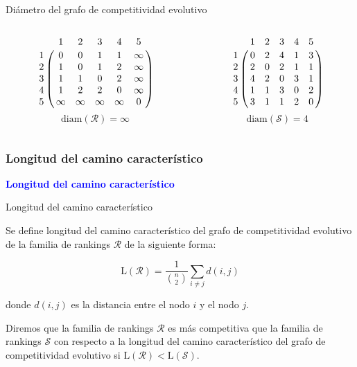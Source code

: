 \documentclass[10pt,hyperref={unicode}]{beamer}
\begin{document}
	\begin{frame}{Diámetro del grafo de competitividad evolutivo}
		\begin{ejemplo}[continuación]
			\begin{columns}[t] %
				\begin{column}{.50\textwidth}
					\begin{equation*}
					\bordermatrix{
						& 1 & 2 & 3 & 4 & 5 \cr
						1 &	0 & 0 & 1 & 1 & \infty \cr
						2 & 1 & 0 & 1 & 2 & \infty \cr
						3 & 1 & 1 & 0 & 2 & \infty \cr
						4 & 1 & 2 & 2 & 0 & \infty \cr
						5 & \infty & \infty & \infty & \infty  &  0  \cr
					}
					\end{equation*}
					\[ \mathrm{diam}(\mathcal{R}) = \infty \]
				\end{column}%
				\hfill%
				\begin{column}{.50\textwidth}
					\begin{equation*}
					\bordermatrix{
						& 1 & 2 & 3 & 4 & 5 \cr
						1 &	0 & 2 & 4 & 1 & 3 \cr
						2 & 2 & 0 & 2 & 1 & 1 \cr
						3 & 4 & 2 & 0 & 3 & 1 \cr
						4 & 1 & 1 & 3 & 0 & 2 \cr
						5 & 3 & 1 & 1 & 2 & 0  \cr
					}
					\end{equation*}
					\[ \mathrm{diam}(\mathcal{S}) = 4 \]
				\end{column}%
			\end{columns}
		\end{ejemplo}
	\end{frame}
	
	\subsubsection{Longitud del camino característico}
	
	\begin{frame}
		\begin{center}
			\Huge\textbf{\textsf{\textcolor{blue}{Longitud del camino característico}}}
		\end{center}
	\end{frame}
	
	\begin{frame}{Longitud del camino característico}
		\begin{defi}
			Se define longitud del camino característico del grafo de competitividad evolutivo de la familia de rankings $\mathcal{R}$ de la siguiente forma:
			
			\begin{equation}
			\mathrm{L}(\mathcal{R}) = \dfrac{1}{\binom{n}{2}} \sum_{i\neq j} d(i,j)
			\end{equation}
			
			donde $d(i,j)$ es la distancia entre el nodo $i$ y el nodo $j$.
		\end{defi}
		
		\begin{defi}
			Diremos que la familia de rankings $\mathcal{R}$ es más competitiva que la familia de rankings $\mathcal{S}$ con respecto a la longitud del camino característico del grafo de competitividad evolutivo si $\mathrm{L}(\mathcal{R}) < \mathrm{L}(\mathcal{S})$.
		\end{defi}
	\end{frame}
	
\end{document}
